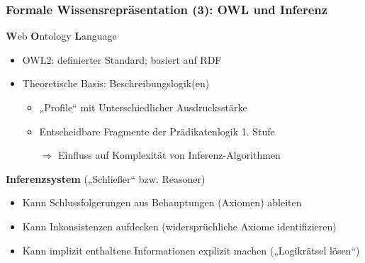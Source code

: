 \documentclass[
	ngerman,
	10pt,				%
	aspectratio=169 	%
]{beamer}
\begin{document}
\begin{frame}[fragile,label=wr6]
  \frametitle{\large Formale Wissensrepräsentation (3): OWL {und Inferenz}}
  
  \textbf{W}eb \textbf{O}ntology \textbf{L}anguage
  \begin{itemize}
   \item OWL2: definierter Standard; basiert auf RDF
   \item Theoretische Basis: Beschreibungslogik(en)
   \begin{itemize}
    \item „Profile“ mit Unterschiedlicher Ausdrucksstärke %
    \item Entscheidbare Fragmente der Prädikatenlogik 1. Stufe
    \item[$\Rightarrow$] Einfluss auf Komplexität von Inferenz-Algorithmen
   \end{itemize}
  \end{itemize}

% 
% 
% 


\medskip
\pause


  \textbf{Inferenzsystem} („Schließer“ bzw. Reasoner)
  \begin{itemize}
   \item Kann Schlussfolgerungen aus Behauptungen (Axiomen) ableiten
   \smallskip
   \item Kann Inkonsistenzen aufdecken (widersprüchliche Axiome identifizieren)
   \item Kann implizit enthaltene Informationen explizit machen („Logikrätsel lösen“)
  \end{itemize}

  
\end{frame}
\end{document}
